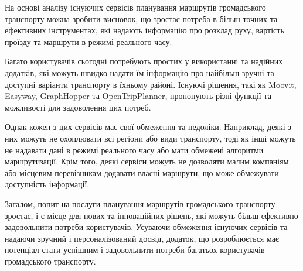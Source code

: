 
На основі аналізу існуючих сервісів планування маршрутів громадського 
транспорту можна зробити висновок, що зростає потреба в більш точних 
та ефективних інструментах, які надають інформацію про розклад руху, 
вартість проїзду та маршрути в режимі реального часу.

Багато користувачів сьогодні потребують простих у використанні та 
надійних додатків, які можуть швидко надати їм інформацію про найбільш 
зручні та доступні варіанти транспорту в їхньому районі. Існуючі 
рішення, такі як Moovit, Easyway, GraphHopper та OpenTripPlanner, 
пропонують різні функції та можливості для задоволення цих потреб.

Однак кожен з цих сервісів має свої обмеження та недоліки. Наприклад, 
деякі з них можуть не охоплювати всі регіони або види транспорту, тоді 
як інші можуть не надавати дані в режимі реального часу або мати 
обмежені алгоритми маршрутизації. Крім того, деякі сервіси можуть не 
дозволяти малим компаніям або місцевим перевізникам додавати власні 
маршрути, що може обмежувати доступність інформації.

Загалом, попит на послуги планування маршрутів громадського транспорту 
зростає, і є місце для нових та інноваційних рішень, які можуть більш 
ефективно задовольнити потреби користувачів. Усуваючи обмеження 
існуючих сервісів та надаючи зручний і персоналізований досвід, 
додаток, що розроблюється має потенціал стати успішним і задовольнити 
потреби багатьох користувачів громадського транспорту.